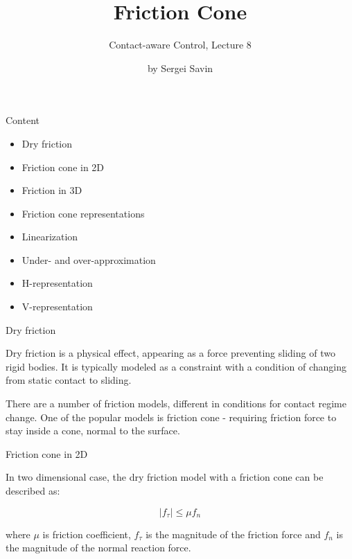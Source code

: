 \documentclass{beamer}
\title{Friction Cone}
\subtitle{Contact-aware Control, Lecture 8}
\author{by Sergei Savin}
\date{\mydate}
\begin{document}
\maketitle


\begin{frame}{Content}

\begin{itemize}
\item Dry friction
\item Friction cone in 2D
\item Friction in 3D
\item Friction cone representations
\item Linearization
\item Under- and over-approximation
\item H-representation
\item V-representation
\end{itemize}

\end{frame}




\begin{frame}{Dry friction}
	\begin{flushleft}
		
		Dry friction is a physical effect, appearing as a force preventing sliding of two rigid bodies. It is typically modeled as a constraint with a condition of changing from static contact to sliding.
		
		\bigskip
		
		There are a number of friction models, different in conditions for contact regime change. One of the popular models is friction cone - requiring friction force to stay inside a cone, normal to the surface.
	
	\end{flushleft}
\end{frame}



\begin{frame}{Friction cone in 2D}
	\begin{flushleft}
		
		In two dimensional case, the dry friction model with a friction cone can be described as:
		
		\begin{equation}
			|f_\tau| \leq \mu f_n
		\end{equation}
		
		where $\mu$ is friction coefficient, $f_\tau$ is the magnitude of the friction force and $f_n$ is the magnitude of the normal reaction force.
		
	\end{flushleft}
\end{frame}
\end{document}
